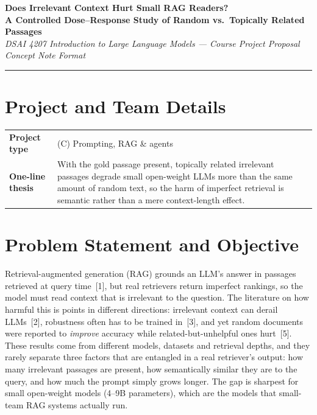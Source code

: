 \documentclass[11pt]{article}
\begin{document}
{\centering
{\LARGE \textbf{Does Irrelevant Context Hurt Small RAG Readers?\\[0.1em]
A Controlled Dose--Response Study of Random vs.\ Topically Related Passages}}\\[0.3em]
{\large \textcolor{PolyUBlue}{\textit{DSAI 4207 Introduction to Large Language Models --- Course Project Proposal}}}\\[0.2em]
{\normalsize \textit{Concept Note Format}}\\[0.5em]
\par}

\vspace{0.2em}
\textcolor{PolyUBlue}{\rule{\linewidth}{0.8pt}}

\section*{Project and Team Details}
\begin{tabularx}{\linewidth}{@{}l X@{}}
\toprule
\textbf{Project type} & (C) Prompting, RAG \& agents \\
\textbf{One-line thesis} & With the gold passage present, topically related irrelevant passages degrade small open-weight LLMs more than the same amount of random text, so the harm of imperfect retrieval is semantic rather than a mere context-length effect. \\
\bottomrule
\end{tabularx}

\section{Problem Statement and Objective}
Retrieval-augmented generation (RAG) grounds an LLM's answer in passages retrieved at query time~[1], but real retrievers return imperfect rankings, so the model must read context that is irrelevant to the question. The literature on how harmful this is points in different directions: irrelevant context can derail LLMs~[2], robustness often has to be trained in~[3], and yet random documents were reported to \emph{improve} accuracy while related-but-unhelpful ones hurt~[5]. These results come from different models, datasets and retrieval depths, and they rarely separate three factors that are entangled in a real retriever's output: how many irrelevant passages are present, how semantically similar they are to the query, and how much the prompt simply grows longer. The gap is sharpest for small open-weight models (4--9B parameters), which are the models that small-team RAG systems actually run.
\end{document}
